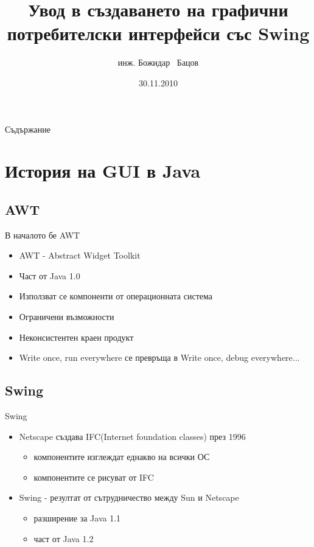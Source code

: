 \documentclass{beamer}
\title{Увод в създаването на графични потребителски интерфейси със Swing}
\author{инж. Божидар ~Бацов}
\institute{Drow Ltd.}
\date{30.11.2010}
\begin{document}
\begin{frame}
  \titlepage
\end{frame}

\begin{frame}{Съдържание}
  \tableofcontents[pausesections]
\end{frame}

\section{История на GUI в Java}

\subsection{AWT}

\begin{frame}{В началото бе AWT}
  \transdissolve
  \begin{itemize}
  \item AWT - Abstract Widget Toolkit
  \item Част от Java 1.0
  \item Използват се компоненти от операционната система
  \item Ограничени възможности
  \item Неконсистентен краен продукт
  \item Write once, run everywhere се превръща в Write once, debug everywhere...
  \end{itemize}
\end{frame}

\subsection{Swing}
\begin{frame}{Swing}
  \transdissolve
  \begin{itemize}
  \item Netscape създава IFC(Internet foundation classes) през 1996
    \begin{itemize}
      \item компонентите изглеждат еднакво на всички ОС
      \item компонентите се рисуват от IFC
    \end{itemize}
  \item Swing - резултат от сътрудничество между Sun и Netscape
    \begin{itemize}
      \item разширение за Java 1.1
      \item част от Java 1.2
    \end{itemize}

  \end{itemize}
\end{frame}
\end{document}

